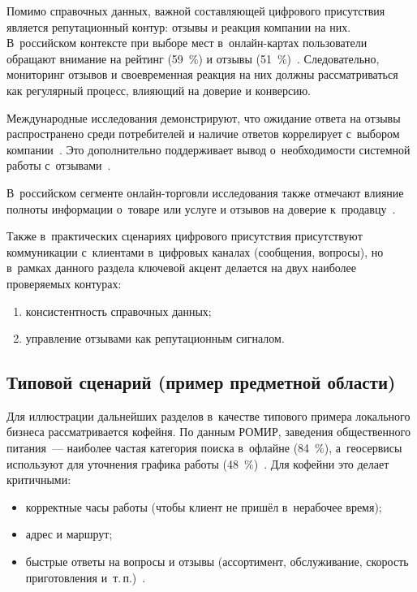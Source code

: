Помимо справочных данных, важной составляющей цифрового присутствия является репутационный контур: отзывы и реакция компании на них. В~российском контексте при выборе мест в~онлайн-картах пользователи обращают внимание на рейтинг (59~\%) и отзывы (51~\%)~\cite{src:35}. Следовательно, мониторинг отзывов и своевременная реакция на них должны рассматриваться как регулярный процесс, влияющий на доверие и конверсию.

Международные исследования демонстрируют, что ожидание ответа на отзывы распространено среди потребителей и наличие ответов коррелирует с~выбором компании~\cite{src:2}. Это дополнительно поддерживает вывод о~необходимости системной работы с~отзывами~\cite{src:2, src:1}.

В~российском сегменте онлайн-торговли исследования также отмечают влияние полноты информации о~товаре или услуге и отзывов на доверие к~продавцу~\cite{src:36}.

Также в~практических сценариях цифрового присутствия присутствуют коммуникации с~клиентами в~цифровых каналах (сообщения, вопросы), но в~рамках данного раздела ключевой акцент делается на двух наиболее проверяемых контурах:

\begin{enumerate}
  \item консистентность справочных данных;
  \item управление отзывами как репутационным сигналом.
\end{enumerate}

\subsection{Типовой сценарий (пример предметной области)}
\label{subsec:coffee-scenario}

Для иллюстрации дальнейших разделов в~качестве типового примера локального бизнеса рассматривается кофейня. По данным РОМИР, заведения общественного питания~--- наиболее частая категория поиска в~офлайне (84~\%), а~геосервисы используют для уточнения графика работы (48~\%)~\cite{src:35}. Для кофейни это делает критичными:

\begin{itemize}
  \item корректные часы работы (чтобы клиент не пришёл в~нерабочее время);
  \item адрес и маршрут;
  \item быстрые ответы на вопросы и отзывы (ассортимент, обслуживание, скорость приготовления и~т.\,п.)~\cite{src:35, src:2}.
\end{itemize}

